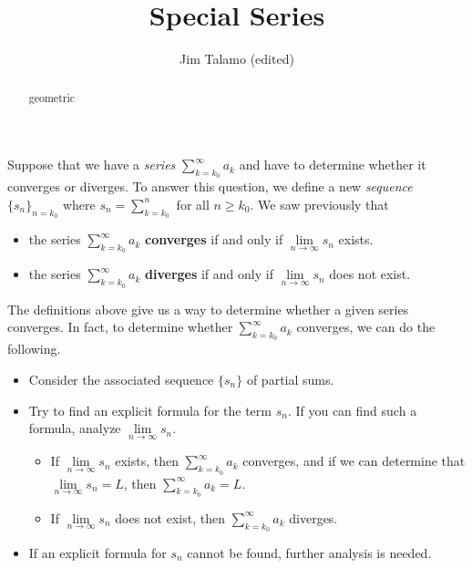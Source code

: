 \documentclass{ximera}
\author{Jim Talamo (edited)}
\title{Special Series}
\begin{document}
\begin{abstract}
geometric
\end{abstract}
\maketitle

Suppose that we have a \emph{series} $\sum\limits_{k=k_0}^{\infty} a_k$ and have to determine whether it converges or diverges.  To answer this question, we define a new \emph{sequence} $\{s_n\}_{n=k_0}$ where $s_n = \sum\limits_{k=k_0}^{n}$ for all $n \geq k_0$.  We saw previously that
 
 \begin{itemize}
\item the series $\sum\limits_{k=k_0}^\infty a_k$ \textbf{converges} if and only if $\lim\limits_{n\to\infty} s_n$ exists.  
\item the series $\sum\limits_{k=k_0}^\infty a_k$ \textbf{diverges} if and only if $\lim\limits_{n\to\infty} s_n$ does not exist.  
\end{itemize}

The definitions above give us a way to determine whether a given series converges.  In fact, to determine whether $\sum\limits_{k=k_0}^{\infty} a_k$ converges, we can do the following.

\begin{itemize}
\item Consider the associated sequence $\{s_n\}$ of partial sums.
\item Try to find an explicit formula for the term $s_n$.  If you can find such a formula, analyze $\lim\limits_{n \to \infty} s_n$.  
\begin{itemize}
\item If $\lim\limits_{n \to \infty} s_n$ exists, then $\sum\limits_{k=k_0}^{\infty} a_k$ converges, and if we can determine that $\lim\limits_{n \to \infty} s_n =L$, then $\sum\limits_{k=k_0}^{\infty} a_k=L$.  
\item If  $\lim\limits_{n \to \infty} s_n$ does not exist, then $\sum\limits_{k=k_0}^{\infty} a_k$ diverges.
\end{itemize}
\item  If an explicit formula for $s_n$ cannot be found, further analysis is needed.  
\end{itemize}
\end{document}

